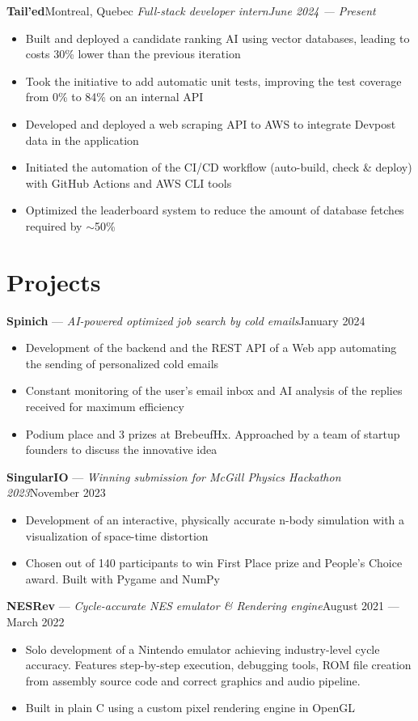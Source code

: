\documentclass{article}
\newcommand{\newrole}[4]{
    {\normalfont\textbf{#1}\hfill#3}
    \newline
    \textit{#2}\hfill\textit{#4}
}
\newcommand{\shortrole}[3]{
    {\normalfont\textbf{#1} --- \textit{#2}\hfill#3\vspace*{-4pt}}
}
\newenvironment{bulletpoints}{\begin{itemize}\setlength\itemsep{-0.3em}}{\end{itemize}}
\begin{document}
\newrole{Tail'ed}{Full-stack developer intern}{Montreal, Quebec}{June 2024 --- Present}
\begin{bulletpoints}
    \item Built and deployed a candidate ranking AI using vector databases, leading to costs 30\% lower than the previous iteration
    \item Took the initiative to add automatic unit tests, improving the test coverage from 0\% to 84\% on an internal API
    \item Developed and deployed a web scraping API to AWS to integrate Devpost data in the application
    \item Initiated the automation of the CI/CD workflow (auto-build, check \& deploy) with GitHub Actions and AWS CLI tools
    \item Optimized the leaderboard system to reduce the amount of database fetches required by $\sim$50\%
\end{bulletpoints}


\section*{Projects}

\shortrole{Spinich}{AI-powered optimized job search by cold emails}{January 2024}
\begin{bulletpoints}
    \item Development of the backend and the REST API of a Web app automating the sending of personalized cold emails
    \item Constant monitoring of the user's email inbox and AI analysis of the replies received for maximum efficiency
    \item Podium place and 3 prizes at BrebeufHx. Approached by a team of startup founders to discuss the innovative idea
\end{bulletpoints}

\shortrole{SingularIO}{Winning submission for McGill Physics Hackathon 2023}{November 2023}
\begin{bulletpoints}
    \item Development of an interactive, physically accurate n-body simulation with a visualization of space-time distortion
    \item Chosen out of 140 participants to win First Place prize and People’s Choice award. Built with Pygame and NumPy
\end{bulletpoints}

\shortrole{NESRev}{Cycle-accurate NES emulator \& Rendering engine}{August 2021 --- March 2022}
\begin{bulletpoints}
    \item Solo development of a Nintendo emulator achieving industry-level cycle accuracy. Features step-by-step execution, debugging tools, ROM file creation from assembly source code and correct graphics and audio pipeline.
    \item Built in plain C using a custom pixel rendering engine in OpenGL
\end{bulletpoints}
\end{document}

